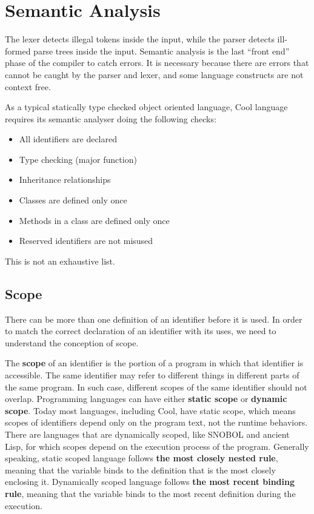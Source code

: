 \ifx\PREAMBLE\undefined


\fi
\chapter{Semantic Analysis}
The lexer detects illegal tokens inside the input, while the parser detects ill-formed parse trees inside the input. Semantic analysis is the last ``front end'' phase of the compiler to catch errors. It is necessary because there are errors that cannot be caught by the parser and lexer, and some language constructs are not context free. 

As a typical statically type checked object oriented language, Cool language requires its semantic analyser doing the following checks:
\begin{itemize}
\item All identifiers are declared
\item Type checking (major function)
\item Inheritance relationships
\item Classes are defined only once
\item Methods in a class are defined only once
\item Reserved identifiers are not misused
\end{itemize} 
This is not an exhaustive list.
\section{Scope}
There can be more than one definition of an identifier before it is used. In order to match the correct declaration of an identifier with its uses, we need to understand the conception of scope. 

The {\bf scope} of an identifier is the portion of a program in which that identifier is accessible. The same identifier may refer to different things in different parts of the same program. In such case, different scopes of the same identifier should not overlap. Programming languages can have either {\bf static scope} or {\bf dynamic scope}. Today most languages, including Cool, have static scope, which means scopes of identifiers depend only on the program text, not the runtime behaviors. There are languages that are dynamically scoped, like SNOBOL and ancient Lisp, for which scopes depend on the execution process of the program. Generally speaking, static scoped language follows {\bf the most closely nested rule}, meaning that the variable binds to the definition that is the most closely enclosing it. Dynamically scoped language follows {\bf the most recent binding rule}, meaning that the variable binds to the most recent definition during the execution.

